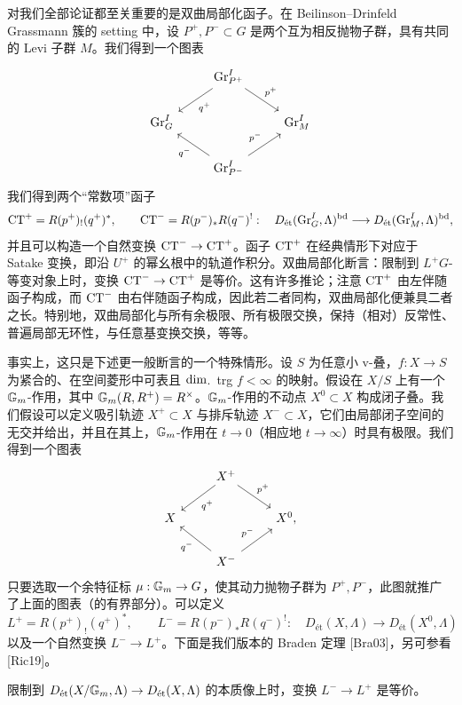 对我们全部论证都至关重要的是双曲局部化函子。在 Beilinson–Drinfeld Grassmann 簇的 setting 中，设 $P^+,P^-\subset G$ 是两个互为相反抛物子群，具有共同的 Levi 子群 $M$。我们得到一个图表
\[
\begin{tikzcd}
& \Gr^I_{P^+} \arrow[dl,"q^+"] \arrow[dr,"p^+"] & \\
\Gr^I_G & & \Gr^I_M \\
& \Gr^I_{P^-} \arrow[ul,"q^-"] \arrow[ur,"p^-"] &
\end{tikzcd}
\]
我们得到两个“常数项”函子
\[
\operatorname{CT}^+=R(p^+)_!(q^+)^*,\qquad
\operatorname{CT}^-=R(p^-)_*R(q^-)^!:\quad
D_{\text{\'et}}(\mathrm{Gr}^I_G,\Lambda)^{\mathrm{bd}}\longrightarrow D_{\text{\'et}}(\mathrm{Gr}^I_M,\Lambda)^{\mathrm{bd}},
\]
并且可以构造一个自然变换 $\operatorname{CT}^-\to\operatorname{CT}^+$。函子 $\operatorname{CT}^+$ 在经典情形下对应于 Satake 变换，即沿 $U^+$ 的幂幺根中的轨道作积分。双曲局部化断言：限制到 $L^+G$-等变对象上时，变换 $\operatorname{CT}^-\to\operatorname{CT}^+$ 是等价。这有许多推论；注意 $\operatorname{CT}^+$ 由左伴随函子构成，而 $\operatorname{CT}^-$ 由右伴随函子构成，因此若二者同构，双曲局部化便兼具二者之长。特别地，双曲局部化与所有余极限、所有极限交换，保持（相对）反常性、普遍局部无环性，与任意基变换交换，等等。



事实上，这只是下述更一般断言的一个特殊情形。设 $S$ 为任意小 v-叠，$f:X\to S$ 为紧合的、在空间菱形中可表且 $\operatorname{dim}$.\ trg $f<\infty$ 的映射。假设在 $X/S$ 上有一个 $\mathbb{G}_m$-作用，其中 $\mathbb{G}_m(R,R^+)=R^\times$。$\mathbb{G}_m$-作用的不动点 $X^0\subset X$ 构成闭子叠。我们假设可以定义吸引轨迹 $X^+\subset X$ 与排斥轨迹 $X^-\subset X$，它们由局部闭子空间的无交并给出，并且在其上，$\mathbb{G}_m$-作用在 $t\to0$（相应地 $t\to\infty$）时具有极限。我们得到一个图表
\[
\begin{tikzcd}
& X^+ \arrow[dl,"q^+"] \arrow[dr,"p^+"] & \\
X & & X^0, \\
& X^- \arrow[ul,"q^-"] \arrow[ur,"p^-"] &
\end{tikzcd}
\]
只要选取一个余特征标 $\mu:\mathbb{G}_m\to G$，使其动力抛物子群为 $P^+,P^-$，此图就推广了上面的图表（的有界部分）。可以定义
\[
L^+=R(p^+)_!(q^+)^*,\qquad L^-=R(p^-)_*R(q^-)^!:\quad D_{\text{\'et}}(X,\Lambda)\longrightarrow D_{\text{\'et}}(X^0,\Lambda)
\]
以及一个自然变换 $L^-\to L^+$。下面是我们版本的 Braden 定理 [Bra03]，另可参看 [Ric19]。

\begin{theorem}%
限制到 $D_{\text{\'et}}(X/\mathbb{G}_m,\Lambda)\to D_{\text{\'et}}(X,\Lambda)$ 的本质像上时，变换 $L^-\to L^+$ 是等价。
\end{theorem}



